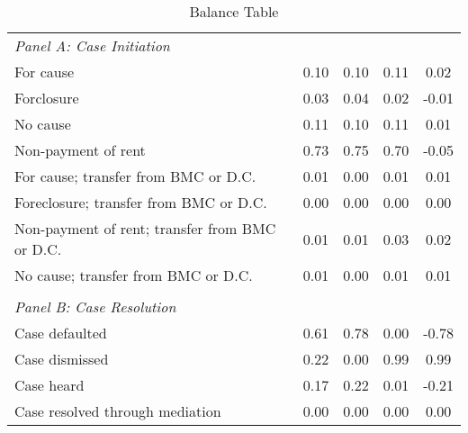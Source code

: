 \begin{table}[htbp]\centering
\def\sym#1{\ifmmode^{#1}\else\(^{#1}\)\fi}
\caption{Balance Table}
\begin{tabular}{l*{4}{c}}
\toprule
\midrule
\emph{Panel A: Case Initiation}&            &            &            &            \\
\hspace{0.25cm}For cause&       0.10 &       0.10 &       0.11 &        0.02\\
\hspace{0.25cm}Forclosure&       0.03 &       0.04 &       0.02 &       -0.01\\
\hspace{0.25cm}No cause&       0.11 &       0.10 &       0.11 &        0.01\\
\hspace{0.25cm}Non-payment of rent&       0.73 &       0.75 &       0.70 &       -0.05\\
\hspace{0.25cm}For cause; transfer from BMC or D.C.&       0.01 &       0.00 &       0.01 &        0.01\\
\hspace{0.25cm}Foreclosure; transfer from BMC or D.C.&       0.00 &       0.00 &       0.00 &        0.00\\
\hspace{0.25cm}Non-payment of rent; transfer from BMC or D.C.&       0.01 &       0.01 &       0.03 &        0.02\\
\hspace{0.25cm}No cause; transfer from BMC or D.C.&       0.01 &       0.00 &       0.01 &        0.01\\
\vspace{0.1em} \\ \emph{Panel B: Case Resolution}&            &            &            &            \\
\hspace{0.25cm}Case defaulted&       0.61 &       0.78 &       0.00 &       -0.78\\
\hspace{0.25cm}Case dismissed&       0.22 &       0.00 &       0.99 &        0.99\\
\hspace{0.25cm}Case heard&       0.17 &       0.22 &       0.01 &       -0.21\\
\hspace{0.25cm}Case resolved through mediation&       0.00 &       0.00 &       0.00 &        0.00\\

\end{tabular}
\end{table}
